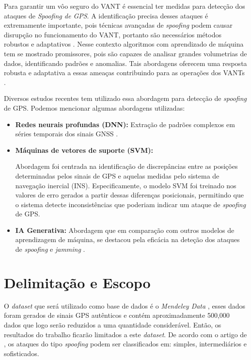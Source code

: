 \documentclass[12pt]{article}
\begin{document}
Para garantir um vôo seguro do VANT é essencial ter medidas para detecção dos ataques de \textit{Spoofing de GPS}.
A identificação precisa desses ataques é extremamente importante, pois técnicas avançadas de \textit{spoofing}
podem causar disrupção no funcionamento do VANT, portanto são necessários métodos robustos e adaptativos \cite{isleyenGPSSpoofingDetection2024}.
Nesse contexto algoritmos com aprendizado de máquina tem se mostrado promissores, pois são capazes de analisar
grandes volumetrias de dados, identificando padrões e anomalias. Tais abordagens oferecem uma resposta robusta e adaptativa a essas ameaças contribuindo para as operações dos VANTs \cite{isleyenGPSSpoofingDetection2024}.

Diversos estudos recentes tem utilizado
essa abordagem para detecção de \textit{spoofing} de GPS.
Podemos mencionar algumas abordagens utilizadas:

\begin{itemize}
    \item \textbf{Redes neurais profundas (DNN):} Extração de padrões complexos em séries temporais dos sinais GNSS \cite{isleyenGPSSpoofingDetection2024}.

    \item \textbf{Máquinas de vetores de suporte (SVM):}

     Abordagem foi centrada na identificação
     de discrepâncias entre as posições determinadas pelos sinais de GPS
     e aquelas medidas pelo sistema de navegação inercial (INS).
     Especificamente, o modelo SVM foi treinado nos valores de erro
     gerados a partir dessas diferenças posicionais,
     permitindo que o sistema detecte inconsistências que poderiam
     indicar um ataque de \textit{spoofing} de GPS.
     \cite{panice2017}
    

    \item \textbf{IA Generativa:}  Abordagem que em comparação com outros modelos de aprendizagem de máquina, se destacou pela eficácia na deteção dos ataques de \textit{spoofing} e \textit{jamming}  \cite{elalamiDroneDefGANtGenerativeAIBased2024}.
    
\end{itemize}



\section{Delimitação e Escopo}
O \textit{dataset} que será utilizado como base de dados é o \textit{Mendeley Data} 
\cite{aissou2022dataset}, esses dados foram gerados de sinais GPS autênticos e 
contém aproximadamente 500,000 dados que logo serão reduzidos a uma quantidade
considerável. Então, os resultados do trabalho ficarão
limitados a este \textit{dataset}. De acordo com o artigo de \cite{Aissou2021}, os ataques do tipo \textit{spoofing} podem ser classificados em: simples, intermediários e sofisticados.
\end{document}
